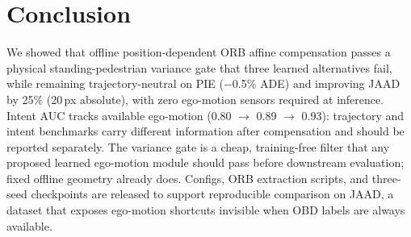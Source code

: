 \documentclass[conference]{IEEEtran}
\begin{document}
\section{Conclusion}
\label{sec:conclusion}

We showed that offline position-dependent ORB affine compensation passes a physical standing-pedestrian variance gate that three learned alternatives fail, while remaining trajectory-neutral on PIE ($-$0.5\% ADE) and improving JAAD by 25\% (20\,px absolute), with zero ego-motion sensors required at inference.
Intent AUC tracks available ego-motion (0.80 $\rightarrow$ 0.89 $\rightarrow$ 0.93): trajectory and intent benchmarks carry different information after compensation and should be reported separately.
The variance gate is a cheap, training-free filter that any proposed learned ego-motion module should pass before downstream evaluation; fixed offline geometry already does.
Configs, ORB extraction scripts, and three-seed checkpoints are released to support reproducible comparison on JAAD, a dataset that exposes ego-motion shortcuts invisible when OBD labels are always available.



\end{document}
